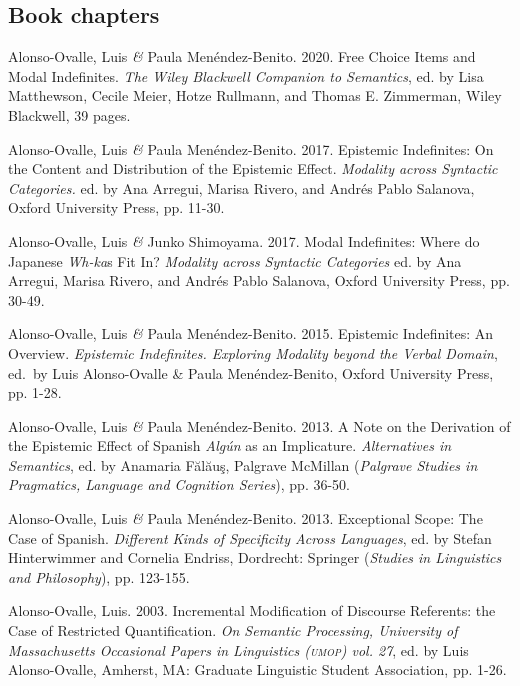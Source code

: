\documentclass[11pt]{article}
\begin{document}

\subsection*{Book chapters} 

Alonso-Ovalle, Luis \textit{\&} Paula Men\'endez-Benito. 2020. Free Choice Items and Modal Indefinites. \textit{The Wiley Blackwell Companion to Semantics}, ed. by Lisa Matthewson, Cecile Meier, Hotze Rullmann, and Thomas E. Zimmerman, Wiley Blackwell, 39 pages. %

Alonso-Ovalle, Luis \textit{\&} Paula Men\'endez-Benito. 2017. Epistemic Indefinites: On the Content and Distribution of the Epistemic Effect. \textit{Modality across Syntactic Categories.} ed. by Ana Arregui, Marisa Rivero, and Andr\'es Pablo Salanova, Oxford University Press, pp. 11-30.

Alonso-Ovalle, Luis \textit{\&} Junko Shimoyama. 2017. Modal Indefinites: Where do Japanese \textit{Wh-ka}s Fit In? \textit{Modality across Syntactic Categories} ed. by Ana Arregui, Marisa Rivero, and Andr\'es Pablo Salanova, Oxford University Press,  pp. 30-49.

Alonso-Ovalle, Luis \textit{\&} Paula Men\'endez-Benito. 2015. Epistemic Indefinites: An Overview. \textit{Epistemic Indefinites. Exploring Modality beyond the Verbal Domain}, ed.\ by Luis Alonso-Ovalle \& Paula Men\'endez-Benito, Oxford University Press, pp. 1-28.

Alonso-Ovalle, Luis \textit{\&} Paula Men\'endez-Benito. 2013. A Note on the Derivation of the Epistemic Effect of Spanish
\textit{Alg\'un} as an Implicature. \textit{Alternatives in Semantics}, ed. by
Anamaria F\u{a}l\u{a}u\c{s}, Palgrave McMillan (\textit{Palgrave
  Studies in Pragmatics, Language and Cognition Series}), pp. 36-50.

Alonso-Ovalle, Luis \textit{\&} Paula Men\'endez-Benito. 2013. Exceptional Scope: The Case of Spanish. \textit{Different Kinds of Specificity Across Languages}, ed. by
Stefan Hinterwimmer and Cornelia Endriss, Dordrecht: Springer
(\textit{Studies in Linguistics and Philosophy}), pp. 123-155.

Alonso-Ovalle, Luis. 2003. Incremental Modification of Discourse Referents: the Case of Restricted Quantification. \textit{On Semantic Processing, University of Massachusetts Occasional Papers in Linguistics (\textsc{umop}) vol. 27}, ed. by Luis Alonso-Ovalle, Amherst, MA: Graduate Linguistic Student Association, pp. 1-26.
\end{document}
